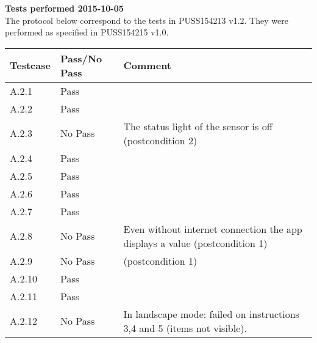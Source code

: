 \renewcommand{\testdate}{2015-10-05}
\textbf{Tests performed \testdate} \\
The protocol below correspond to the tests in PUSS154213 v1.2. They were performed as specified in PUSS154215 v1.0.
	\begin{center}
  		\begin{tabular}{| p{3cm} | p{5cm} | p{5cm} |}
    		\hline
	    	\textbf{Testcase}			& \textbf{Pass/No Pass} 	& \textbf{Comment} \\ \hline
    		A.2.1		 						& Pass 								&  				\\ \hline
    		A.2.2		 						& Pass  							& 				 \\	\hline
    		A.2.3		 						& No Pass 							& The status light of the sensor is off (postcondition 2)				 \\	\hline
    		A.2.4		 						& Pass  							& 				 \\	\hline
    		A.2.5		 						& Pass 								& 			 \\	\hline
    		A.2.6		 						& Pass 								& 				 \\	\hline
    		A.2.7		 						& Pass 								& 				 \\	\hline
    		A.2.8		 						& No Pass 							& Even without internet connection the app displays a value (postcondition 1)			 \\	\hline
    		A.2.9		 						& No Pass 							& (postcondition 1)				 \\	\hline
    		A.2.10	 							& Pass 								& 				 \\	\hline
    		A.2.11	 							& Pass 								& 				 \\	\hline
    		A.2.12	 							& No Pass 								& In landscape mode: failed on instructions 3,4 and 5 (items not visible). 				 \\	\hline
 		 \end{tabular}
	\end{center}